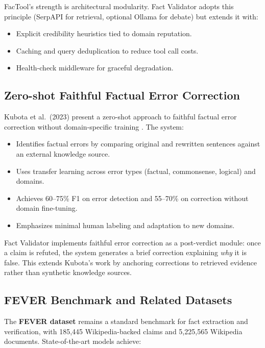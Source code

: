 \documentclass[12pt,a4paper,twoside]{article}
\begin{document}
FacTool's strength is architectural modularity. Fact Validator adopts this principle (SerpAPI for retrieval, optional Ollama for debate) but extends it with:
\begin{itemize}
    \item Explicit credibility heuristics tied to domain reputation.
    \item Caching and query deduplication to reduce tool call costs.
    \item Health-check middleware for graceful degradation.
\end{itemize}

\subsection{Zero-shot Faithful Factual Error Correction}

Kubota et al.\ (2023) present a zero-shot approach to faithful factual error correction without domain-specific training \cite{kubota2023zero}. The system:

\begin{itemize}
    \item Identifies factual errors by comparing original and rewritten sentences against an external knowledge source.
    \item Uses transfer learning across error types (factual, commonsense, logical) and domains.
    \item Achieves 60--75\% F1 on error detection and 55--70\% on correction without domain fine-tuning.
    \item Emphasizes minimal human labeling and adaptation to new domains.
\end{itemize}

Fact Validator implements faithful error correction as a post-verdict module: once a claim is refuted, the system generates a brief correction explaining \textit{why} it is false. This extends Kubota's work by anchoring corrections to retrieved evidence rather than synthetic knowledge sources.

\subsection{FEVER Benchmark and Related Datasets}

The \textbf{FEVER dataset} \cite{thorne2018fever} remains a standard benchmark for fact extraction and verification, with 185,445 Wikipedia-backed claims and 5,225,565 Wikipedia documents. State-of-the-art models achieve:
\end{document}
